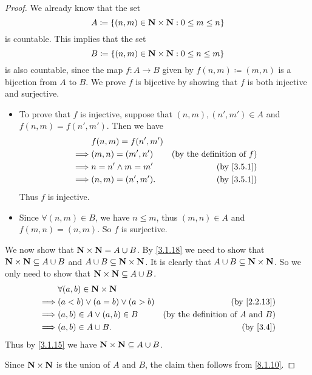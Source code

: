\begin{proof}
  We already know that the set
  \[
    A \coloneqq \{(n, m) \in \mathbf{N} \times \mathbf{N} : 0 \leq m \leq n\}
  \]
  is countable.
  This implies that the set
  \[
    B \coloneqq \{(n, m) \in \mathbf{N} \times \mathbf{N} : 0 \leq n \leq m\}
  \]
  is also countable, since the map \(f : A \to B\) given by \(f(n, m) \coloneqq (m, n)\) is a bijection from \(A\) to \(B\).
  We prove \(f\) is bijective by showing that \(f\) is both injective and surjective.
  \begin{itemize}
    \item To prove that \(f\) is injective, suppose that \((n, m), (n', m') \in A\) and \(f(n, m) = f(n', m')\).
          Then we have
          \begin{align*}
                     & f(n, m) = f(n', m')                                       \\
            \implies & (m, n) = (m', n')   & \text{(by the definition of \(f\))} \\
            \implies & n = n' \land m = m' & \text{(by \cref{3.5.1})}            \\
            \implies & (n, m) = (n', m').  & \text{(by \cref{3.5.1})}
          \end{align*}
          Thus \(f\) is injective.
    \item Since \(\forall (n, m) \in B\), we have \(n \leq m\), thus \((m, n) \in A\) and \(f(m, n) = (n, m)\).
          So \(f\) is surjective.
  \end{itemize}

  We now show that \(\mathbf{N} \times \mathbf{N} = A \cup B\).
  By \cref{3.1.18} we need to show that \(\mathbf{N} \times \mathbf{N} \subseteq A \cup B\) and \(A \cup B \subseteq \mathbf{N} \times \mathbf{N}\).
  It is clearly that \(A \cup B \subseteq \mathbf{N} \times \mathbf{N}\).
  So we only need to show that \(\mathbf{N} \times \mathbf{N} \subseteq A \cup B\).
  \begin{align*}
             & \forall (a, b) \in \N \times \N                                                   \\
    \implies & (a < b) \lor (a = b) \lor (a > b) & \text{(by \cref{2.2.13})}                     \\
    \implies & (a, b) \in A \lor (a, b) \in B    & \text{(by the definition of \(A\) and \(B\))} \\
    \implies & (a, b) \in A \cup B.              & \text{(by \cref{3.4})}
  \end{align*}
  Thus by \cref{3.1.15} we have \(\mathbf{N} \times \mathbf{N} \subseteq A \cup B\).

  Since \(\mathbf{N} \times \mathbf{N}\) is the union of \(A\) and \(B\), the claim then follows from \cref{8.1.10}.
\end{proof}

